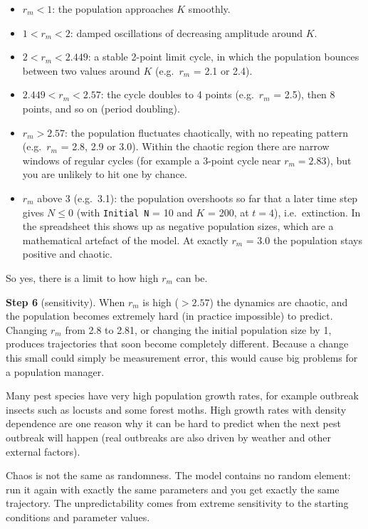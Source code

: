 \documentclass[
  a4paper]{book}
\providecommand{\tightlist}{%
  \setlength{\itemsep}{0pt}\setlength{\parskip}{0pt}}
\begin{document}
\begin{itemize}
\tightlist
\item
  \(r_m < 1\): the population approaches \(K\) smoothly.
\item
  \(1 < r_m < 2\): damped oscillations of decreasing amplitude around \(K\).
\item
  \(2 < r_m < 2.449\): a stable 2-point limit cycle, in which the population bounces between two values around \(K\) (e.g.~\(r_m\) = 2.1 or 2.4).
\item
  \(2.449 < r_m < 2.57\): the cycle doubles to 4 points (e.g.~\(r_m\) = 2.5), then 8 points, and so on (period doubling).
\item
  \(r_m > 2.57\): the population fluctuates chaotically, with no repeating pattern (e.g.~\(r_m\) = 2.8, 2.9 or 3.0). Within the chaotic region there are narrow windows of regular cycles (for example a 3-point cycle near \(r_m = 2.83\)), but you are unlikely to hit one by chance.
\item
  \(r_m\) above 3 (e.g.~3.1): the population overshoots so far that a later time step gives \(N \leq 0\) (with \texttt{Initial\ N} = 10 and \(K\) = 200, at \(t = 4\)), i.e.~extinction. In the spreadsheet this shows up as negative population sizes, which are a mathematical artefact of the model. At exactly \(r_m\) = 3.0 the population stays positive and chaotic.
\end{itemize}

So yes, there is a limit to how high \(r_m\) can be.

\textbf{Step 6} (sensitivity). When \(r_m\) is high (\(> 2.57\)) the dynamics are chaotic, and the population becomes extremely hard (in practice impossible) to predict. Changing \(r_m\) from 2.8 to 2.81, or changing the initial population size by 1, produces trajectories that soon become completely different. Because a change this small could simply be measurement error, this would cause big problems for a population manager.

Many pest species have very high population growth rates, for example outbreak insects such as locusts and some forest moths. High growth rates with density dependence are one reason why it can be hard to predict when the next pest outbreak will happen (real outbreaks are also driven by weather and other external factors).

Chaos is not the same as randomness. The model contains no random element: run it again with exactly the same parameters and you get exactly the same trajectory. The unpredictability comes from extreme sensitivity to the starting conditions and parameter values.
\end{document}
